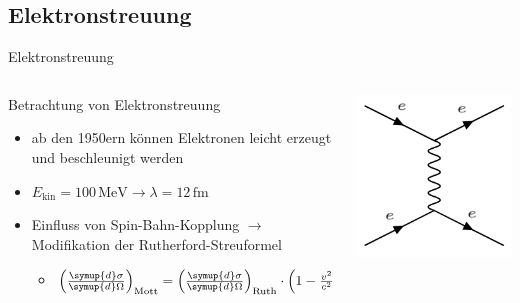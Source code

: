 \documentclass[aspectratio=1610, 9pt]{beamer}
\begin{document}
\subsection{Elektronstreuung}
\begin{frame}{Elektronstreuung}
  \begin{columns}
    \begin{column}{0.6\textwidth}
  Betrachtung von Elektronstreuung
      \begin{itemize}
        \item{ab den 1950ern können Elektronen leicht erzeugt und beschleunigt werden}
        \item{$E_\text{kin} = 100 \,\mathrm{MeV} \rightarrow \lambda = 12\,\mathrm{fm} $}
        \item{Einfluss von Spin-Bahn-Kopplung $\rightarrow$ Modifikation der Rutherford-Streuformel}
      \begin{itemize}
         \item{$ \left( \frac{\symup{d} \sigma}{\symup{d} \Omega } \right)_\text{Mott} = \left( \frac{\symup{d} \sigma}{\symup{d} \Omega } \right)_\text{Ruth} \cdot \left( 1-\frac{v^2}{c^2} \sin^2{ \frac{\vartheta}{2} } \right) $}
      \end{itemize} 
      \end{itemize}
    \end{column}

  \begin{column}{0.4\textwidth}
    \includegraphics[scale=0.3]{images/ee-scattering.png}
  \end{column}

  \end{columns}
\end{frame}
\end{document}
